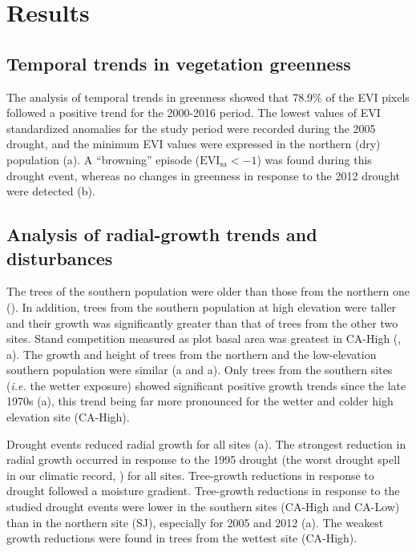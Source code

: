 \section{Results}\label{sec:dendroResults}
\subsection{Temporal trends in vegetation greenness}\label{sec:dendro:ResultsEVI}

The analysis of temporal trends in greenness showed that 78.9\% of the EVI pixels followed a positive trend for the 2000-2016 period. The lowest values of EVI standardized anomalies for the study period were recorded during the 2005 drought, and the minimum EVI values were expressed in the northern (dry) population (a). A ``browning'' episode (\(\mathrm{EVI_{sa}} < -1\)) was found during this drought event, whereas no changes in greenness in response to the 2012 drought were detected (b).

\subsection{Analysis of radial-growth trends and disturbances}\label{sec:dendro:ResultsBAI}
The trees of the southern population were older than those from the northern one (). In addition, trees from the southern population at high elevation were taller and their growth was significantly greater than that of trees from the other two sites. Stand competition measured as plot basal area was greatest in CA-High (, a). The growth and height of trees from the northern and the low-elevation southern population were similar (a and a). Only trees from the southern sites (\emph{i.e.} the wetter exposure) showed significant positive growth trends since the late 1970s (a), this trend being far more pronounced for the wetter and colder high elevation site (CA-High).

Drought events reduced radial growth for all sites (a). The strongest reduction in radial growth occurred in response to the 1995 drought (the worst drought spell in our climatic record, ) for all sites. Tree-growth reductions in response to drought followed a moisture gradient. Tree-growth reductions in response to the studied drought events were lower in the southern sites (CA-High and CA-Low) than in the northern site (SJ), especially for 2005 and 2012 (a). The weakest growth reductions were found in trees from the wettest site (CA-High).

